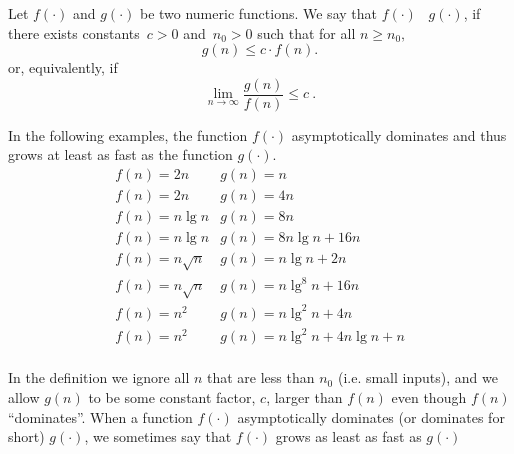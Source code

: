 \begin{flex}

  \begin{definition}
    Let $f(\cdot)$ and $g(\cdot)$ be two numeric functions.  We say that
    $f(\cdot)$~ $g(\cdot)$,  if there
    exists constants~$c > 0$ and~$n_0 > 0$ such that for all 
    $n \ge n_0,$
    \[
      g(n) \le c \cdot f(n).
    \]
    or, equivalently, if
    \[\lim_{n \rightarrow \infty} \frac{g(n)}{f(n)} \leq c~.\]
  \end{definition}

  \begin{example}
    In the following examples, the function $f(\cdot)$ asymptotically 
    dominates and thus grows at least as fast as the function $g(\cdot)$. 
    \[
      \begin{array}{ll}
        f(n) = 2n & g(n) = n \\
        f(n) = 2n & g(n) = 4n \\
        f(n) = n\lg{n} & g(n) = 8n \\
        f(n) = n\lg{n} & g(n) = 8n\lg{n} + 16n \\
        f(n) = n\sqrt{n} & g(n) = n\lg{n} + 2n \\
        f(n) = n\sqrt{n} & g(n) = n\lg^8{n} + 16n \\
        f(n) = n^2 & g(n) = n\lg^2{n} + 4n \\
        f(n) = n^2 & g(n) = n\lg^2{n} + 4n\lg{n} + n \\
      \end{array}
    \]
  \end{example}

\end{flex}

\begin{gram}
In the definition we ignore all $n$ that are less than 
$n_0$ (i.e. small inputs), and we allow $g(n)$ to be some constant factor, $c$, larger
than $f(n)$ even though $f(n)$ ``dominates''.
When a function $f(\cdot)$ asymptotically dominates (or dominates for short)
$g(\cdot)$,  we sometimes say that $f(\cdot)$ grows as least as fast as
$g(\cdot)$
\end{gram}

